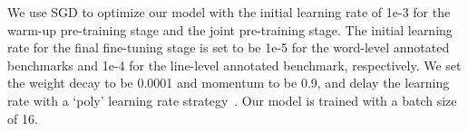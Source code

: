 We use SGD to optimize our model with the initial learning rate of 1e-3 for the warm-up pre-training stage and the joint pre-training stage. The initial learning rate for the final fine-tuning stage is set to be 1e-5 for the word-level annotated benchmarks and 1e-4 for the line-level annotated benchmark, respectively. We set the weight decay to be 0.0001 and momentum to be 0.9, and delay the learning rate with a `poly’ learning rate strategy~\cite{chen2017deeplab}. Our model is trained with a batch size of 16. 

\begin{comment}
\begin{table*}[!t]
\renewcommand{\arraystretch}{1.1}
  \caption{Effect of varying the number of deformable transformer encoder layers in Feature Extractor of \textbf{SRSTS v2}.}
  \label{tab:encoder}
  \centering
  \begin{tabular}{c|ccccc|cccccc}
    \toprule
    \multirow{3}*{\#Layers} &\multicolumn{5}{c|}{CTW1500} & \multicolumn{6}{c}{Total-Text}\\
\cmidrule(lr){2-6}
    \cmidrule(lr){7-12}
   &\multicolumn{3}{c}{Detection} & \multicolumn{2}{c|}{E2E} &\multicolumn{3}{c}{Detection} & \multicolumn{2}{c}{E2E} & \multirow{2}*{FPS}\\
   \cmidrule(lr){2-4}
   \cmidrule(lr){5-6}
   \cmidrule(lr){7-9}
    \cmidrule(lr){10-11}
&P&R&F & None & Full&P&R&F & None & Full\\
    \midrule
0 & 91.38 & 84.04&87.56& 56.98 & 82.29 &
 92.13  &83.97 &87.86&79.75&87.05 & \textbf{20.22}\\
    2 & 91.09&\textbf{84.45}&87.64&56.76&82.28&\textbf{93.97} & 85.20 & 89.37& 80.07&86.76 &17.02\\
    4 & \textbf{91.79}&83.97&87.70&57.31&82.81&92.89 &86.43 & \textbf{89.55} &81.00 & 87.05 &15.22\\ 
    6 &91.70&84.23&\textbf{87.80}&\textbf{59.57}&\textbf{82.88}&92.42 &\textbf{86.52} & 89.37 &\textbf{81.37} & \textbf{87.29} & 13.44\\  
    \bottomrule
  \end{tabular}
\end{table*}
\end{comment}
